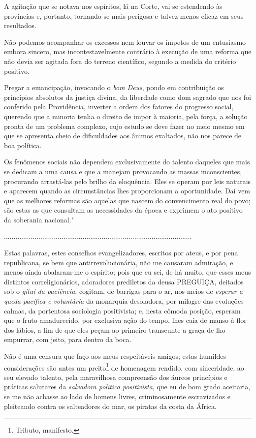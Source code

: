 {A agitação que se notava nos espíritos, lá na Corte, vai se estendendo
às províncias e, portanto, tornando-se mais perigosa e talvez menos
eficaz em seus resultados.

Não podemos acompanhar os excessos nem louvar os ímpetos de um
entusiasmo embora sincero, mas incontestavelmente contrário à execução
de uma reforma que não devia ser agitada fora do terreno científico,
segundo a medida do critério positivo.

Pregar a emancipação, invocando o \emph{bom Deus}, pondo em contribuição
os princípios absolutos da justiça divina, da liberdade como dom sagrado
que nos foi conferido pela Providência, inverter a ordem dos fatores do
progresso social, querendo que a minoria tenha o direito de impor à
maioria, pela força, a solução pronta de um problema complexo, cujo
estudo se deve fazer no meio mesmo em que se apresenta cheio de
dificuldades aos ânimos exaltados, não nos parece de boa política.

Os fenômenos sociais não dependem exclusivamente do talento daqueles que
mais se dedicam a uma causa e que a manejam provocando as massas
inconscientes, procurando arrastá-las pelo brilho da eloquência. Eles se
operam por leis naturais e aparecem quando as circunstâncias lhes
proporcionam a oportunidade. Daí vem que as melhores reformas são
aquelas que nascem do convencimento real do povo; são estas as que
consultam as necessidades da época e exprimem o ato positivo da
soberania nacional."

..................................................................................................

Estas palavras, estes conselhos evangelizadores, escritos por ateus, e
por pena republicana, se bem que antirrevolucionária, não me causaram
admiração, e menos ainda abalaram-me o espírito; pois que eu sei, de há
muito, que esses meus distintos correligionários, adoradores prediletos
da deusa PREGUIÇA, deitados sob o \emph{gitai da paciência}, cogitam, de
barrigas para o ar, nos meios de \emph{esperar a queda pacífica e
voluntária} da monarquia desoladora, por milagre das evoluções calmas,
da portentosa sociologia positivista; e, nesta cômoda posição, esperam
que o fruto amadurecido, por exclusiva ação do tempo, lhes caía de manso
à flor dos lábios, a fim de que eles peçam ao primeiro transeunte a
graça de lho empurrar, com jeito, para dentro da boca.

Não é uma censura que faço aos meus respeitáveis amigos; estas humildes
considerações são antes um preito\footnote{Tributo, manifesto.} de
homenagem rendido, com sinceridade, ao seu elevado talento, pela
maravilhosa compreensão dos áureos princípios e práticas salutares da
\emph{salvadora política positivista}, que eu de bom grado aceitaria, se
me não achasse ao lado de homens livres, criminosamente escravizados e
pleiteando contra os salteadores do mar, os piratas da costa da África.

}
